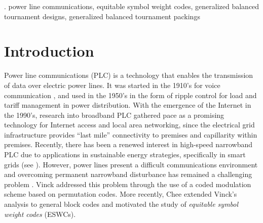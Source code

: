 \documentclass[draft, 11pt]{article}
\begin{document}
 \begin{abstract}
 Generalized balance tournament packings (GBTPs) extend the
 concept of generalized balanced tournament designs 
 introduced by Lamken and Vanstone (1989).
 In this paper, we establish the connection between GBTPs
 and a class of codes called equitable symbol weight codes.
 The latter were recently demonstrated to optimize
 the performance against narrowband noise in a general coded
 modulation scheme for power line communications. 
 By constructing classes of GBTPs, we establish infinite families of
  optimal equitable symbol weight codes
 with code lengths greater than alphabet size and
 whose narrowband noise error-correcting capability to code length ratios
 do not diminish to zero as the length grows.

 \end{abstract}

 .
 power line communications,
 equitable symbol weight codes, 
 generalized balanced tournament designs,
 generalized balanced tournament packings
% 
 
 \pagebreak



\section{Introduction}
Power line communications (PLC) is a 
technology that enables the transmission of data over 
electric power lines.
It was started in the 1910's for voice communication \cite{Schwartz:2009}, and used in
the 1950's in the form of ripple control for load and tariff management
in power distribution.
With the emergence of the Internet in the 1990's, research into broadband PLC
gathered pace as a promising technology for Internet access and local area networking, since
the electrical grid infrastructure provides ``last mile'' connectivity
to premises and capillarity within premises. Recently, there has been a renewed interest
in high-speed narrowband PLC due to applications in sustainable energy strategies, specifically in
smart grids (see \cite{Haidineetal:2011,Dzungetal:2011,Liuetal:2011,ZhangYang:2011}).
However, power lines present a difficult communications environment and
overcoming permanent narrowband disturbance has remained a
challenging problem \cite{Vinck:2000,Biglieri:2003,Pavlidouetal:2003}.
Vinck \cite{Vinck:2000} addressed this problem through the use of a 
coded modulation scheme based on permutation codes.
More recently,
Chee \etal \cite{Cheeetal:2013tc} extended Vinck's analysis to general block codes
and motivated the study of {\em equitable symbol weight codes} (ESWCs).
\end{document}

